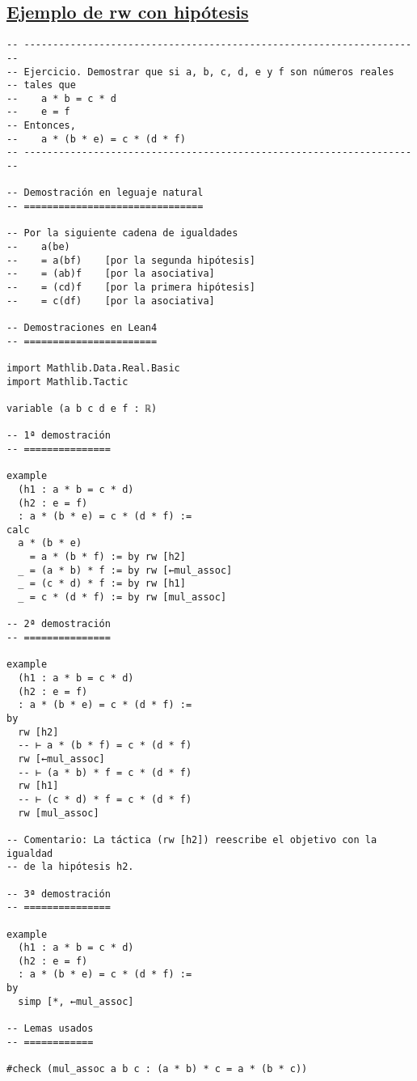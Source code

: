 \subsection{\href{./src/Basicos/Ejemplo\_de\_rw\_sobre\_hipotesis.lean}{Ejemplo de rw con hipótesis}}
\label{sec:org91fb13f}
\begin{verbatim}
-- ---------------------------------------------------------------------
-- Ejercicio. Demostrar que si a, b, c, d, e y f son números reales
-- tales que
--    a * b = c * d
--    e = f
-- Entonces,
--    a * (b * e) = c * (d * f)
-- ---------------------------------------------------------------------

-- Demostración en leguaje natural
-- ===============================

-- Por la siguiente cadena de igualdades
--    a(be)
--    = a(bf)    [por la segunda hipótesis]
--    = (ab)f    [por la asociativa]
--    = (cd)f    [por la primera hipótesis]
--    = c(df)    [por la asociativa]

-- Demostraciones en Lean4
-- =======================

import Mathlib.Data.Real.Basic
import Mathlib.Tactic

variable (a b c d e f : ℝ)

-- 1ª demostración
-- ===============

example
  (h1 : a * b = c * d)
  (h2 : e = f)
  : a * (b * e) = c * (d * f) :=
calc
  a * (b * e)
    = a * (b * f) := by rw [h2]
  _ = (a * b) * f := by rw [←mul_assoc]
  _ = (c * d) * f := by rw [h1]
  _ = c * (d * f) := by rw [mul_assoc]

-- 2ª demostración
-- ===============

example
  (h1 : a * b = c * d)
  (h2 : e = f)
  : a * (b * e) = c * (d * f) :=
by
  rw [h2]
  -- ⊢ a * (b * f) = c * (d * f)
  rw [←mul_assoc]
  -- ⊢ (a * b) * f = c * (d * f)
  rw [h1]
  -- ⊢ (c * d) * f = c * (d * f)
  rw [mul_assoc]

-- Comentario: La táctica (rw [h2]) reescribe el objetivo con la igualdad
-- de la hipótesis h2.

-- 3ª demostración
-- ===============

example
  (h1 : a * b = c * d)
  (h2 : e = f)
  : a * (b * e) = c * (d * f) :=
by
  simp [*, ←mul_assoc]

-- Lemas usados
-- ============

#check (mul_assoc a b c : (a * b) * c = a * (b * c))
\end{verbatim}

